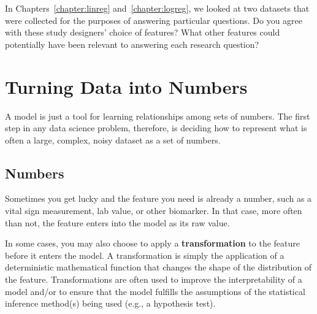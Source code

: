 \begin{question}{}
In Chapters~\ref{chapter:linreg} and~\ref{chapter:logreg}, we looked at two datasets that were collected for the purposes of answering particular questions. Do you agree with these study designers' choice of features? What other features could potentially have been relevant to answering each research question?
\end{question}


\section{Turning Data into Numbers}

A model is just a tool for learning relationships among sets of numbers. The first step in any data science problem, therefore, is deciding how to represent what is often a large, complex, noisy dataset as a set of numbers. 

\subsection{Numbers}

Sometimes you get lucky and the feature you need is already a number, such as a vital sign measurement, lab value, or other biomarker. In that case, more often than not, the feature enters into the model as its raw value.

In some cases, you may also choose to apply a \textbf{transformation} to the feature before it enters the model. A transformation is simply the application of a deterministic mathematical function that changes the shape of the distribution of the feature. Transformations are often used to improve the interpretability of a model and/or to ensure that the model fulfills the assumptions of the statistical inference method(s) being used (e.g., a hypothesis test).
\vspace{4mm}

